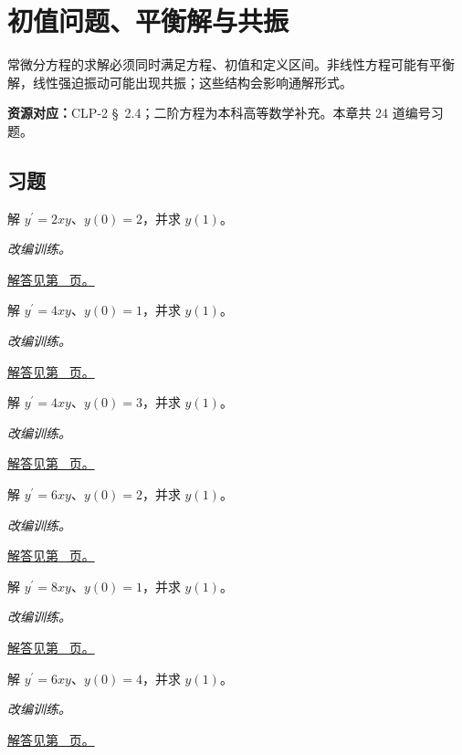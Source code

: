 \documentclass[12pt,fontset=fandol]{ctexart}
\begin{document}
\clearpage
\section{初值问题、平衡解与共振}\label{sec:ch23}
常微分方程的求解必须同时满足方程、初值和定义区间。非线性方程可能有平衡解，线性强迫振动可能出现共振；这些结构会影响通解形式。

\textbf{资源对应：}CLP-2 \S~2.4；二阶方程为本科高等数学补充。本章共 24 道编号习题。
\subsection{习题}
\begin{example}[变量系数的可分离方程]\label{ex:c23q1}
解 $y^{\prime}=2xy$、$y(0)=2$，并求 $y(1)$。
\par\textit{改编训练。}\par\hyperref[ans:c23q1]{解答见第~\pageref{ans:c23q1} 页。}
\end{example}
\begin{example}[变量系数的可分离方程]\label{ex:c23q2}
解 $y^{\prime}=4xy$、$y(0)=1$，并求 $y(1)$。
\par\textit{改编训练。}\par\hyperref[ans:c23q2]{解答见第~\pageref{ans:c23q2} 页。}
\end{example}
\begin{example}[变量系数的可分离方程]\label{ex:c23q3}
解 $y^{\prime}=4xy$、$y(0)=3$，并求 $y(1)$。
\par\textit{改编训练。}\par\hyperref[ans:c23q3]{解答见第~\pageref{ans:c23q3} 页。}
\end{example}
\begin{example}[变量系数的可分离方程]\label{ex:c23q4}
解 $y^{\prime}=6xy$、$y(0)=2$，并求 $y(1)$。
\par\textit{改编训练。}\par\hyperref[ans:c23q4]{解答见第~\pageref{ans:c23q4} 页。}
\end{example}
\begin{example}[变量系数的可分离方程]\label{ex:c23q5}
解 $y^{\prime}=8xy$、$y(0)=1$，并求 $y(1)$。
\par\textit{改编训练。}\par\hyperref[ans:c23q5]{解答见第~\pageref{ans:c23q5} 页。}
\end{example}
\begin{example}[变量系数的可分离方程]\label{ex:c23q6}
解 $y^{\prime}=6xy$、$y(0)=4$，并求 $y(1)$。
\par\textit{改编训练。}\par\hyperref[ans:c23q6]{解答见第~\pageref{ans:c23q6} 页。}
\end{example}
\end{document}
